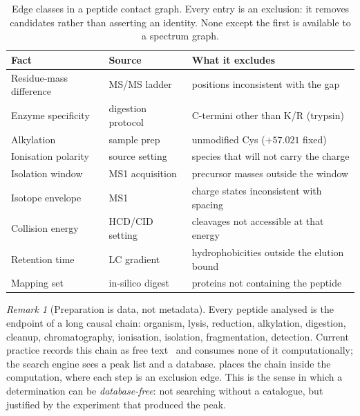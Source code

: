 \documentclass[11pt,a4paper]{article}
\theoremstyle{definition}
\theoremstyle{remark}
\newtheorem{remark}[theorem]{Remark}
\begin{document}
\begin{table}[t]
\centering
\small
\caption{Edge classes in a peptide contact graph. Every entry is an
exclusion: it removes candidates rather than asserting an identity.
None except the first is available to a spectrum graph.}
\label{tab:edges}
\begin{tabular}{@{}p{}p{}p{}@{}}
\toprule
\textbf{Fact} & \textbf{Source} & \textbf{What it excludes} \\
\midrule
Residue-mass difference & MS/MS ladder & positions inconsistent with the gap \\
Enzyme specificity & digestion protocol~\citep{olsen2004trypsin} & C-termini other than K/R (trypsin) \\
Alkylation & sample prep~\citep{sechi1998method} & unmodified Cys ($+57.021$ fixed) \\
Ionisation polarity & source setting~\citep{fenn1989electrospray} & species that will not carry the charge \\
Isolation window & MS1 acquisition & precursor masses outside the window \\
Isotope envelope & MS1 & charge states inconsistent with spacing \\
Collision energy & HCD/CID setting~\citep{olsen2007higher} & cleavages not accessible at that energy \\
Retention time & LC gradient~\citep{krokhin2006sequence} & hydrophobicities outside the elution bound \\
Mapping set & in-silico digest & proteins not containing the peptide \\
\bottomrule
\end{tabular}
\end{table}

\begin{remark}[Preparation is data, not metadata]
\label{rem:prep}
Every peptide analysed is the endpoint of a long causal chain: organism,
lysis, reduction, alkylation, digestion, cleanup, chromatography,
ionisation, isolation, fragmentation, detection. Current practice records
this chain as free text~\citep{taylor2007guidelines} and consumes none of
it computationally; the search engine sees a peak list and a database.
 places the chain inside the computation, where each step
is an exclusion edge. This is the sense in which a determination can be
\emph{database-free}: not searching without a catalogue, but justified by
the experiment that produced the peak.
\end{remark}
\end{document}
